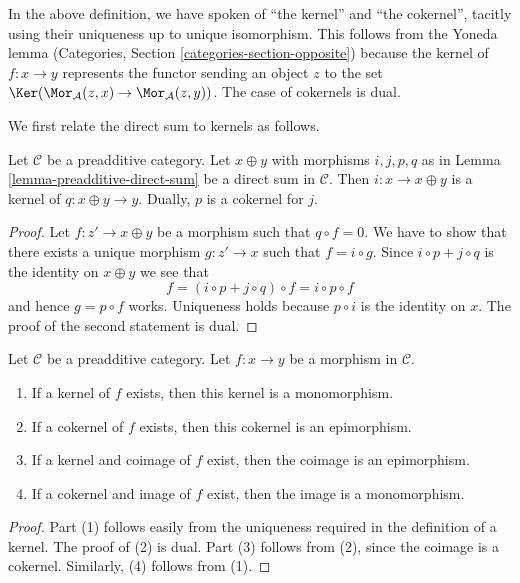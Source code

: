 \noindent
In the above definition, we have spoken of ``the kernel'' and
``the cokernel'', tacitly using their uniqueness
up to unique isomorphism. This follows from the Yoneda lemma
(Categories, Section \ref{categories-section-opposite})
because the kernel of $f : x \to y$ represents the functor
sending an object $z$ to the set
$\Ker(\Mor_\mathcal{A}(z, x) \to \Mor_\mathcal{A}(z, y))$.
The case of cokernels is dual.

\medskip\noindent
We first relate the direct sum to kernels as follows.

\begin{lemma}
\label{lemma-additive-cat-biproduct-kernel}
Let $\mathcal{C}$ be a preadditive category.
Let $x \oplus y$ with morphisms $i, j, p, q$ as in
Lemma \ref{lemma-preadditive-direct-sum}
be a direct sum in $\mathcal{C}$. Then $i : x \to x \oplus y$
is a kernel of $q : x \oplus y \rightarrow y$. Dually, $p$ is
a cokernel for $j$.
\end{lemma}

\begin{proof}
Let $f : z' \to x \oplus y$ be a morphism such that $q \circ f = 0$.
We have to show that there exists a unique morphism $g : z' \to x$
such that $f = i \circ g$. Since $i \circ p + j \circ q$ is the identity on
$x \oplus y$ we see that
$$
f = (i \circ p + j \circ q) \circ f = i \circ p \circ f
$$
and hence $g = p \circ f$ works. Uniqueness holds because $p \circ i$
is the identity on $x$. The proof of the second statement is dual.
\end{proof}

\begin{lemma}
\label{lemma-kernel-mono}
Let $\mathcal{C}$ be a preadditive category.
Let $f : x \to y$ be a morphism in $\mathcal{C}$.
\begin{enumerate}
\item If a kernel of $f$ exists, then
this kernel is a monomorphism.
\item If a cokernel of $f$ exists, then
this cokernel is an epimorphism.
\item If a kernel and coimage of $f$ exist, then
the coimage is an epimorphism.
\item If a cokernel and image of $f$ exist, then
the image is a monomorphism.
\end{enumerate}
\end{lemma}

\begin{proof}
Part (1) follows easily from the uniqueness required in the
definition of a kernel. The proof of (2) is dual.
Part (3) follows from (2), since the coimage is a cokernel.
Similarly, (4) follows from (1).
\end{proof}

